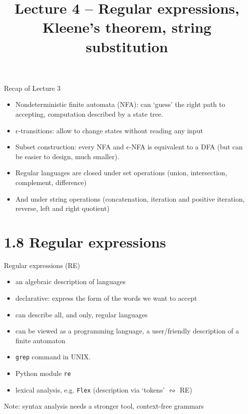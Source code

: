 \documentclass[handout]{beamer}
\title{Lecture 4 -- Regular expressions, Kleene's theorem, string substitution}
\begin{document}
\frame{\titlepage}


\begin{frame}{Recap of Lecture 3}

    \begin{itemize}
        \item Nondeterministic finite automata (NFA): can `guess' the right path to accepting, computation described by a state tree.
        \item $\epsilon$-transitions: allow to change states without reading any input
        \item Subset construction: every NFA and $\epsilon$-NFA is equivalent to a DFA (but can be easier to design, much smaller).
        \item Regular languages are closed under set operations (union, intersection, complement, difference)
        \item And under string operations (concatenation, iteration and positive iteration, reverse, left and right quotient)
    \end{itemize}

\end{frame}


\section{1.8 Regular expressions}


\begin{frame}{Regular expressions (RE)}
    
    \begin{itemize}
        \item an algebraic description of languages
        \item declarative: express the form of the words we want to accept
        \item can describe all, and only, regular languages
        \item can be viewed as a programming language, a user/friendly description of a finite automaton
    \end{itemize}

    \begin{example}
    \begin{itemize}
        \item \texttt{grep} command in UNIX.
        \item Python module \texttt{re}
        \item \alert{lexical analysis}, e.g. \texttt{Flex} (description via `tokens' $\leftrightsquigarrow$ RE)
    \end{itemize}
    \end{example}

    Note: \alert{syntax analysis} needs a stronger tool, \alert{context-free grammars}

\end{frame}
\end{document}
